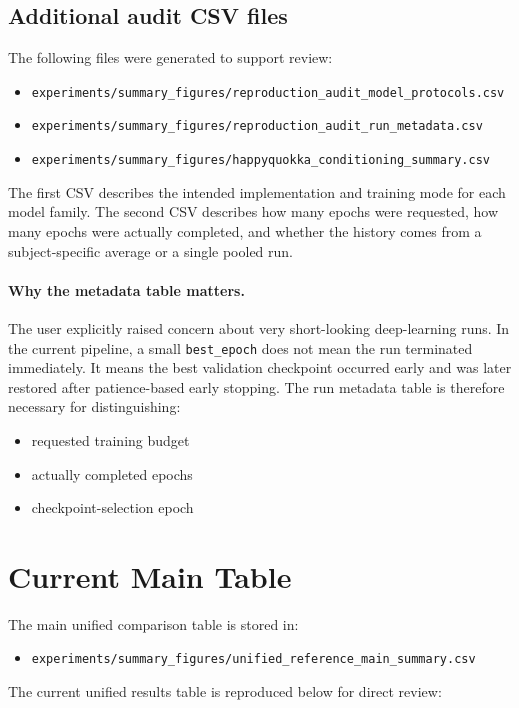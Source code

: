 \documentclass[11pt]{article}
\begin{document}
\subsection*{Additional audit CSV files}
The following files were generated to support review:
\begin{itemize}
\item \texttt{experiments/summary\_figures/reproduction\_audit\_model\_protocols.csv}
\item \texttt{experiments/summary\_figures/reproduction\_audit\_run\_metadata.csv}
\item \texttt{experiments/summary\_figures/happyquokka\_conditioning\_summary.csv}
\end{itemize}
The first CSV describes the intended implementation and training mode for each model family. The second CSV describes how many epochs were requested, how many epochs were actually completed, and whether the history comes from a subject-specific average or a single pooled run.

\paragraph{Why the metadata table matters.}
The user explicitly raised concern about very short-looking deep-learning runs. In the current pipeline, a small \texttt{best\_epoch} does not mean the run terminated immediately. It means the best validation checkpoint occurred early and was later restored after patience-based early stopping. The run metadata table is therefore necessary for distinguishing:
\begin{itemize}
\item requested training budget
\item actually completed epochs
\item checkpoint-selection epoch
\end{itemize}

\section*{Current Main Table}
The main unified comparison table is stored in:
\begin{itemize}
\item \texttt{experiments/summary\_figures/unified\_reference\_main\_summary.csv}
\end{itemize}

The current unified results table is reproduced below for direct review:
\end{document}
